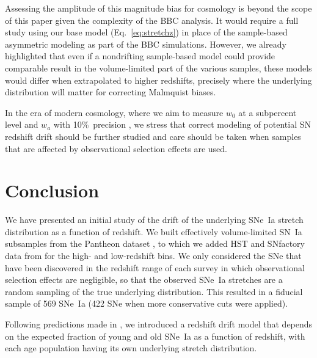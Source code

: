 \documentclass[]{aa}
\begin{document}
Assessing the amplitude of this magnitude bias for cosmology is beyond the scope
of this paper given the complexity of the BBC analysis. It would require a full
study using our base model (Eq.~\ref{eq:stretchz}) in place of the sample-based
asymmetric modeling as part of the BBC simulations. However, we already
highlighted that even if a nondrifting sample-based model could provide
comparable result in the volume-limited part of the various samples, these
models would differ when extrapolated to higher redshifts, precisely where the
underlying distribution will matter for correcting Malmquist biases.

In the era of modern cosmology, where we aim to measure $w_0$ at a subpercent
level and $w_a$ with 10\%\ precision \citep[e.g.,][]{lsstpaper}, we stress that
correct modeling of potential SN redshift drift should be further studied and
care should be taken when samples that are affected by observational selection
effects are used.

\section{Conclusion}\label{sec:ccl}

We have presented an initial study of the drift of the underlying SNe~Ia stretch
distribution as a function of redshift. We built effectively volume-limited
SN~Ia subsamples from the Pantheon dataset \citep[][SDSS, PS1, and
SNLS]{scolnic2018a}, to which we added HST and SNfactory data from
\cite{rigault2020} for the high- and low-redshift bins. We only considered the
SNe that have been discovered in the redshift range of each survey in which
observational selection effects are negligible, so that the observed SNe~Ia
stretches are a random sampling of the true underlying distribution. This
resulted in a fiducial sample of 569 SNe~Ia (422 SNe when more conservative cuts
were applied).

Following predictions made in \cite{rigault2020}, we introduced a redshift drift
model that depends on the expected fraction of young and old SNe~Ia as a
function of redshift, with each age population having its own underlying stretch
distribution.
\end{document}
